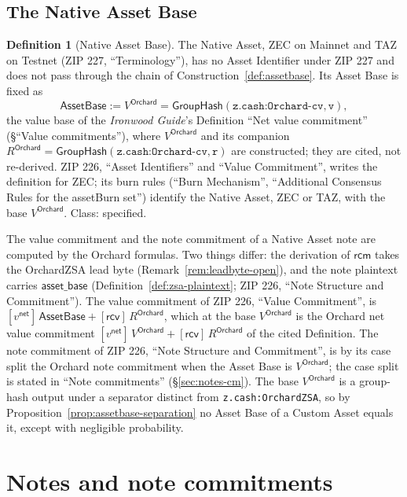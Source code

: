 \documentclass[11pt,a4paper]{article}
\theoremstyle{definition}
\newtheorem{definition}[theorem]{Definition}
\newcommand{\GroupHash}{\ensuremath{\mathsf{GroupHash}}}
\newcommand{\rcv}{\ensuremath{\mathsf{rcv}}}
\newcommand{\rcm}{\ensuremath{\mathsf{rcm}}}
\begin{document}
\FloatBarrier
\subsection{The Native Asset Base}\label{sec:asset-native}

\begin{definition}[Native Asset Base]\label{def:native-base}
The Native Asset, ZEC on Mainnet and TAZ on Testnet (ZIP 227,
``Terminology''), has no Asset Identifier under ZIP 227 and does not pass
through the chain of Construction~\ref{def:assetbase}. Its Asset Base is
fixed as
\[
  \mathsf{AssetBase} := V^{\mathsf{Orchard}}
    = \GroupHash(\texttt{z.cash:Orchard-cv}, \texttt{v}),
\]
the value base of the \emph{Ironwood Guide}'s Definition ``Net value
commitment'' (\S``Value commitments''), where $V^{\mathsf{Orchard}}$ and its
companion $R^{\mathsf{Orchard}} = \GroupHash(\texttt{z.cash:Orchard-cv},
\texttt{r})$ are constructed; they are cited, not re-derived. ZIP 226,
``Asset Identifiers'' and ``Value Commitment'', writes the definition for
ZEC; its burn rules (``Burn Mechanism'', ``Additional Consensus Rules for
the assetBurn set'') identify the Native Asset, ZEC or TAZ, with the base
$V^{\mathsf{Orchard}}$. Class: specified.
\end{definition}

The value commitment and the note commitment of a Native Asset note are
computed by the Orchard formulas. Two things differ: the derivation of
$\rcm$ takes the OrchardZSA lead byte (Remark~\ref{rem:leadbyte-open}),
and the note plaintext carries $\mathsf{asset\_base}$
(Definition~\ref{def:zsa-plaintext}; ZIP 226, ``Note Structure and
Commitment''). The value commitment of ZIP 226, ``Value Commitment'', is
$[v^{\mathsf{net}}]\,\mathsf{AssetBase} + [\rcv]\,R^{\mathsf{Orchard}}$,
which at the base $V^{\mathsf{Orchard}}$ is the Orchard net value commitment
$[v^{\mathsf{net}}]\,V^{\mathsf{Orchard}} + [\rcv]\,R^{\mathsf{Orchard}}$ of
the cited Definition. The note commitment of ZIP 226, ``Note Structure and
Commitment'', is by its case split the Orchard note commitment when the
Asset Base is $V^{\mathsf{Orchard}}$; the case split is stated in ``Note
commitments'' (\S\ref{sec:notes-cm}). The base $V^{\mathsf{Orchard}}$ is a
group-hash output under a separator distinct from
\texttt{z.cash:OrchardZSA}, so by Proposition~\ref{prop:assetbase-separation}
no Asset Base of a Custom Asset equals it, except with negligible
probability.

\section{Notes and note commitments}\label{sec:notes}
\end{document}
